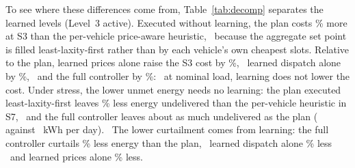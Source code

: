 \begin{table}[t]
\centering
\caption{Contribution of the Learned Levels (Level~3 Active). Plan: Planning Prior Without Learning; Prices Only: Learned Prices, Plan Dispatch; Dispatch Only: Learned Dispatch, Flat Tariff. Units as in Table~\ref{tab:stress}}
\label{tab:decomp}
\footnotesize
\setlength{\tabcolsep}{2.5pt}

\end{table}

To see where these differences come from, Table~\ref{tab:decomp} separates
the learned levels (Level~3 active).
Executed without learning, the plan costs
\GDecompCostVsPlanAbsPriceAwareLThreeSThree\% more at S3 than the per-vehicle
price-aware heuristic,%
\ because the aggregate set point is filled least-laxity-first rather than by
each vehicle's own cheapest slots. Relative to the plan, learned prices alone
raise the S3 cost by \GDecompCostVsPlanAbsNestedPlanpriceSThree\%,%
\ learned dispatch alone by \GDecompCostVsPlanAbsNestedFlatpriceSThree\%,%
\ and the full controller by \GDecompCostVsPlanAbsNestedSThree\%:%
\ at nominal load, learning does not lower the cost. Under stress, the lower
unmet energy needs no learning: the plan executed least-laxity-first leaves \GReductionUnmetPlanPaSSeven\% less energy
undelivered than the per-vehicle heuristic in S7,%
\ and the full controller leaves about as much undelivered as the plan
(\GNestedSSevenUnmet{} against
\GDecompPlanLThreeSSevenResidentialIeeeThreeThreeTestUnmet~kWh per day).%
\ The lower curtailment comes from learning: the full controller curtails
\GDecompCurtVsPlanNestedSSeven\% less energy than the plan,%
\ learned dispatch alone \GDecompCurtVsPlanNestedFlatpriceSSeven\% less%
\ and learned prices alone \GDecompCurtVsPlanNestedPlanpriceSSeven\% less.%


\begin{table}[t]
\centering
\caption{Ablations at S3 and S5, \GAuxSeedsWordCap{} Training Seeds Each (Complete Framework on the Same Seeds). Cost in \euro, Viol.\ in \%; --: Not Evaluated}
\label{tab:ablation}
\footnotesize
\setlength{\tabcolsep}{2.5pt}

\end{table}

